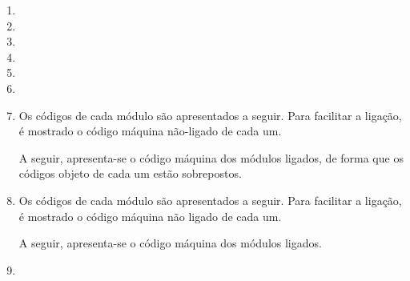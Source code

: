 \begin{enumerate}
    \item
    \item
    \item

    \item 
    
    \item
    \item

    \item
    Os códigos de cada módulo são apresentados a seguir.
    Para facilitar a ligação, é mostrado 
    o código máquina não-ligado de cada um.

    A seguir, apresenta-se o código máquina dos módulos ligados,
    de forma que os códigos objeto de cada um estão sobrepostos.

    \item
    Os códigos de cada módulo são apresentados a seguir.
    Para facilitar a ligação, é mostrado 
    o código máquina não ligado de cada um.

    A seguir, apresenta-se o código máquina dos módulos ligados.

    \item
\end{enumerate}